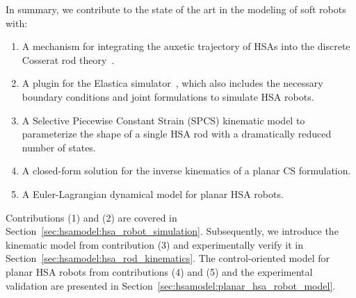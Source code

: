 In summary, we contribute to the state of the art in the modeling of soft robots with:
%
\begin{enumerate}
    \item A mechanism for integrating the auxetic trajectory of \glspl{HSA} into the discrete Cosserat rod theory~\cite{gazzola2018forward, mathew2022sorosim}. %
    \item A plugin for the Elastica simulator~\cite{naughton2021elastica}, which also includes the necessary boundary conditions and joint formulations to simulate \gls{HSA} robots.
    \item A Selective Piecewise Constant Strain (SPCS) kinematic model to parameterize the shape of a single \gls{HSA} rod with a dramatically reduced number of states. %
    \item A closed-form solution for the inverse kinematics of a planar \gls{CS} formulation.
    \item A Euler-Lagrangian dynamical model for planar \gls{HSA} robots.
\end{enumerate}
Contributions (1) and (2) are covered in Section~\ref{sec:hsamodel:hsa_robot_simulation}. Subsequently, we introduce the kinematic model from contribution (3) and experimentally verify it in Section~\ref{sec:hsamodel:hsa_rod_kinematics}. The control-oriented model for planar \gls{HSA} robots from contributions (4) and (5) and the experimental validation are presented in Section~\ref{sec:hsamodel:planar_hsa_robot_model}.